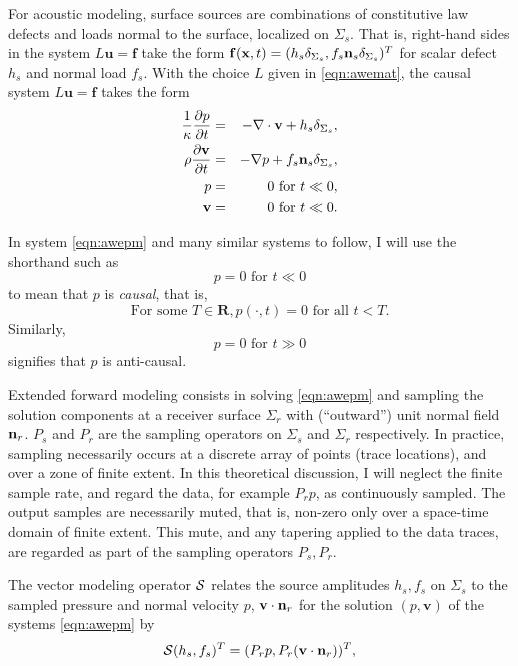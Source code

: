 \documentclass[georeport,12pt]{geophysics}
\newcommand{\bx}{\mathbf{x}}
\newcommand{\bv}{\mathbf{v}}
\newcommand{\bff}{\mathbf{f}}
\newcommand{\bu}{\mathbf{u}}
\newcommand{\bR}{\mathbf{R}}
\begin{document}
For
acoustic modeling, surface sources are combinations of constitutive law
defects and loads normal to the surface, localized on $\Sigma_s$. That
is, right-hand sides in the system $L\bu=\bff$ take the form
$\bff(\bx,t) = (h_s\delta_{\Sigma_s},
f_s{\bf n}_s\delta_{\Sigma_s})^T$ for scalar defect $h_s$ and normal
load $f_s$. With the choice $L$ given in
\ref{eqn:awemat}, the causal system $L\bu=\bff$
takes the form
\begin{eqnarray}
\label{eqn:awepm}
\frac{1}{\kappa}\frac{\partial p}{\partial t} & = & - \nabla \cdot \bv +
h_s \delta_{\Sigma_s}, \nonumber \\
\rho\frac{\partial \bv}{\partial t} & = & - \nabla p +
                                                f_s{\bf n}_s \delta_{\Sigma_s},\nonumber \\
p & =& 0 \mbox{ for }  t \ll 0,\nonumber\\ 
\bv & = & 0 \mbox{ for } t \ll 0.
\end{eqnarray}

 In system \ref{eqn:awepm} and many similar
systems to follow, I will use the shorthand such as
\[
  p = 0 \mbox{ for } t \ll 0 
\]
to mean that $p$ is {\em causal}, that is,
\[
  \mbox{For some } T \in \bR, p(\cdot,t) = 0 \mbox{ for all } t <
  T.
\]
Similarly,
\[
  p = 0 \mbox{ for } t \gg 0 
\]
signifies that $p$ is anti-causal.

Extended forward modeling consists in solving \ref{eqn:awepm} and
sampling the solution components at a receiver surface $\Sigma_r$ with
(``outward'') unit normal field ${\bf n}_r$.
$P_s$ and $P_r$ are the sampling operators on $\Sigma_s$ and
$\Sigma_r$ respectively. In
practice, sampling necessarily occurs at a discrete array of points
(trace locations), and over a zone of finite extent. In this
theoretical discussion, I will neglect the finite sample rate, and
regard the data, for example $P_rp$, as continuously sampled. The
output samples are necessarily muted, that is, non-zero only over a space-time domain
of finite extent. This mute, and any tapering applied to the data
traces, are regarded as part of the sampling operators $P_s,P_r$.

The vector modeling operator ${\cal S}$ relates the source amplitudes
$h_s,f_s$ on $\Sigma_s$ to the sampled pressure and normal velocity
$p$, $\bv \cdot {\bf n}_r$ for 
the solution $(p,\bv)$ of the systems \ref{eqn:awepm} by
\begin{equation}
  {\cal S}(h_s,f_s)^T  = (P_rp,P_r(\bv \cdot {\bf n}_r) )^T,
  \label{eqn:fwd}
\end{equation}
\end{document}
